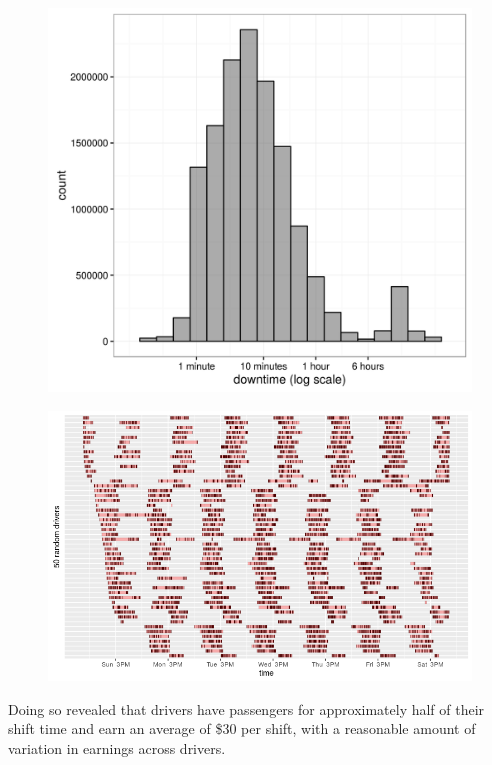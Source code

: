 \documentclass[twocolumn]{article}
\begin{document}
\begin{figure}[t]
  \centering
  \includegraphics[width=.9\linewidth]{downtime_distribution}
  \label{fig:downtime_distribution}
\end{figure}
\begin{figure}[t]
  \centering
  \includegraphics[width=1\linewidth]{shifts_id}
  \label{fig:shifts_id}
\end{figure}
Doing so revealed that drivers have passengers for approximately half of their shift time and earn an average of \$30 per shift, with a reasonable amount of variation in earnings across drivers.
\end{document}
